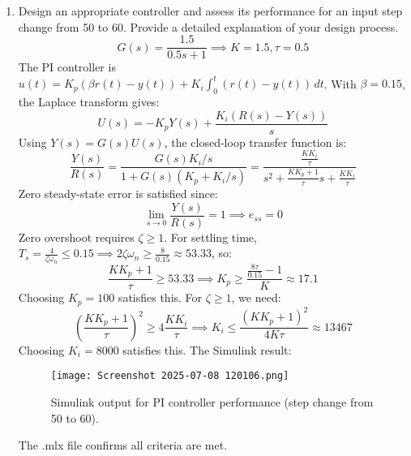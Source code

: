 \documentclass{article}
\begin{document}
\begin{enumerate}
  \item Design an appropriate controller and assess its performance for an input step change from 50 to 60. Provide a detailed explanation of your design process.
  \begin{equation*}
    G(s) = \frac{1.5}{0.5s+1} \implies K=1.5, \tau = 0.5
  \end{equation*}
  The PI controller is $u(t) = K_p (\beta r(t) - y(t)) + K_i \int_0^t (r(t) - y(t)) \, dt$. With $\beta=0.15$, the Laplace transform gives:
  \begin{equation*}
    U(s) = -K_p Y(s) + \frac{K_i (R(s)-Y(s))}{s}
  \end{equation*}
  Using $Y(s) = G(s) U(s)$, the closed-loop transfer function is:
  \begin{equation*}
    \frac{Y(s)}{R(s)} = \frac{G(s) K_i / s}{1 + G(s) (K_p + K_i / s)} = \frac{\frac{K K_i}{\tau}}{s^2 + \frac{K K_p + 1}{\tau} s + \frac{K K_i}{\tau}}
  \end{equation*}
  Zero steady-state error is satisfied since:
  \begin{equation*}
    \lim_{s \to 0} \frac{Y(s)}{R(s)} = 1 \implies e_{ss} = 0
  \end{equation*}
  Zero overshoot requires $\zeta \geq 1$. For settling time, $T_s = \frac{4}{\zeta \omega_n} \leq 0.15 \implies 2\zeta \omega_n \geq \frac{8}{0.15} \approx 53.33$, so:
  \begin{equation*}
    \frac{K K_p + 1}{\tau} \geq 53.33 \implies K_p \geq \frac{\frac{8 \tau}{0.15} - 1}{K} \approx 17.1
  \end{equation*}
  Choosing $K_p = 100$ satisfies this. For $\zeta \geq 1$, we need:
  \begin{equation*}
    \left(\frac{K K_p + 1}{\tau}\right)^2 \geq 4 \frac{K K_i}{\tau} \implies K_i \leq \frac{(K K_p + 1)^2}{4 K \tau} \approx 13467
  \end{equation*}
  Choosing $K_i = 8000$ satisfies this. The Simulink result:
  \begin{figure}[h!]
    \centering
    \texttt{[image: Screenshot 2025-07-08 120106.png]}
    \caption{Simulink output for PI controller performance (step change from 50 to 60).}
    \label{fig:pi_step_response}
  \end{figure}
  The .mlx file confirms all criteria are met.


\end{enumerate}
\end{document}
